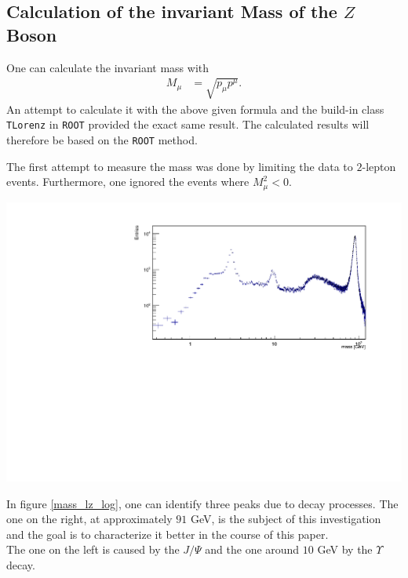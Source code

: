 \documentclass[12pt, a4paper, bibliography=totoc]{scrartcl}
\begin{document}
\begin{multicols}{2}
\subsection{Calculation of the invariant Mass of the $Z$ Boson}
One can calculate the invariant mass with
\begin{align}
	M_{\mu} &= \sqrt{p_{\mu}p^{\mu}}. 
\end{align}
An attempt to calculate it with the above given formula and the build-in class \verb*+TLorenz+ in \verb*+ROOT+ provided the exact same result. 
The calculated results will therefore be based on the \verb*+ROOT+ method.

The first attempt to measure the mass was done by limiting the data to $2$-lepton events. 
Furthermore, one ignored the events where $M_{\mu}^{2} < 0$. 
\begin{center}
	\includegraphics[width=\linewidth]{fig/invar_mass_dist_corrected_axis_title.pdf}
	\label{mass_lz_log}
\end{center}

In figure \ref{mass_lz_log}, one can identify three peaks due to decay processes. 
The one on the right, at approximately $91$ \si{GeV}, is the subject of this investigation and the goal is to characterize it better in the course of this paper.\\
The one on the left is caused by the $J/{\Psi}$ and the one around $10$ \si{GeV} by the $\Upsilon$ decay. 


\end{multicols}
\end{document}
